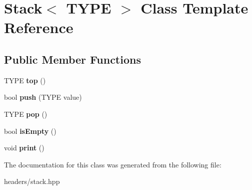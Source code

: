 \hypertarget{classStack}{}\section{Stack$<$ T\+Y\+P\+E $>$ Class Template Reference}
\label{classStack}
\subsection*{Public Member Functions}
\begin{DoxyCompactItemize}
\item 
\hypertarget{classStack_a2f28356fba216e6ac001af9508ef95db}{}T\+Y\+P\+E {\bfseries top} ()\label{classStack_a2f28356fba216e6ac001af9508ef95db}

\item 
\hypertarget{classStack_ab3259dce190b100fcb60b18ecab05da5}{}bool {\bfseries push} (T\+Y\+P\+E value)\label{classStack_ab3259dce190b100fcb60b18ecab05da5}

\item 
\hypertarget{classStack_a2705b0f7ebcad637badc7d79e719a4cb}{}T\+Y\+P\+E {\bfseries pop} ()\label{classStack_a2705b0f7ebcad637badc7d79e719a4cb}

\item 
\hypertarget{classStack_a6d7d416cd3d6ec80209a849518c008de}{}bool {\bfseries is\+Empty} ()\label{classStack_a6d7d416cd3d6ec80209a849518c008de}

\item 
\hypertarget{classStack_a4b3bb902990e0ed945e099805d195506}{}void {\bfseries print} ()\label{classStack_a4b3bb902990e0ed945e099805d195506}

\end{DoxyCompactItemize}


The documentation for this class was generated from the following file\+:\begin{DoxyCompactItemize}
\item 
headers/stack.\+hpp\end{DoxyCompactItemize}
